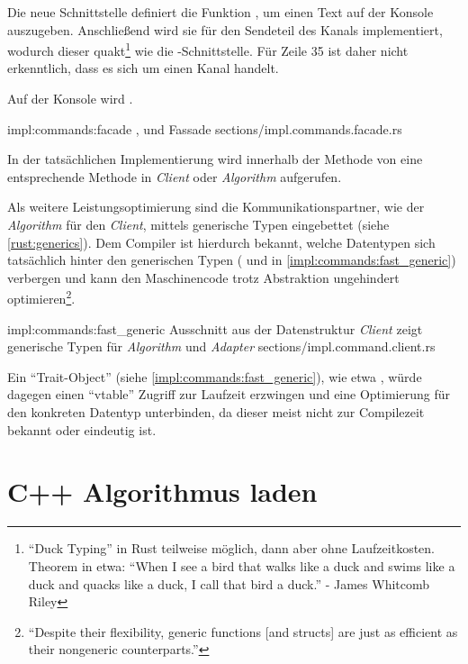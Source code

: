 Die neue Schnittstelle  definiert die Funktion , um einen Text auf der Konsole auszugeben.
Anschließend wird sie für den Sendeteil des Kanals implementiert, wodurch dieser quakt\footnote{\enquote{Duck Typing} \cite[44]{rust:orly_programming} in Rust teilweise möglich, dann aber ohne Laufzeitkosten. Theorem in etwa: \enquote{When I see a bird that walks like a duck and swims like a duck and quacks like a duck, I call that bird a duck.} - James Whitcomb Riley  } wie die -Schnittstelle.
Für Zeile 35 ist daher nicht erkenntlich, dass es sich um einen Kanal handelt.

Auf der Konsole wird  .

\rustcinclude
	{impl:commands:facade}
	{, und Fassade}
	{sections/impl.commands.facade.rs}

In der tatsächlichen Implementierung wird innerhalb der  Methode von  eine entsprechende Methode in \textit{Client} oder \textit{Algorithm} aufgerufen.

Als weitere Leistungsoptimierung sind die Kommunikationspartner, wie der \textit{Algorithm} für den \textit{Client}, mittels generische Typen eingebettet (siehe \autoref{rust:generics}).
Dem Compiler ist hierdurch bekannt, welche Datentypen sich tatsächlich hinter den generischen Typen ( und  in \autoref{impl:commands:fast_generic}) verbergen und kann den Maschinencode trotz Abstraktion ungehindert optimieren\footnote{\enquote{Despite their flexibility, generic functions [and structs] are just as efficient as their nongeneric counterparts.}\cite[45]{rust:orly_programming}}.

\rustcinclude
	{impl:commands:fast_generic}
	{Ausschnitt aus der Datenstruktur \textit{Client} zeigt generische Typen für \textit{Algorithm} und \textit{Adapter}}
	{sections/impl.command.client.rs}
	
Ein \enquote{Trait-Object} (siehe \autoref{impl:commands:fast_generic}), wie etwa , würde dagegen einen \enquote{vtable} Zugriff zur Laufzeit erzwingen und eine Optimierung für den konkreten Datentyp unterbinden, da dieser meist nicht zur Compilezeit bekannt oder eindeutig ist.

\clearpage
\section{C++ Algorithmus laden}

